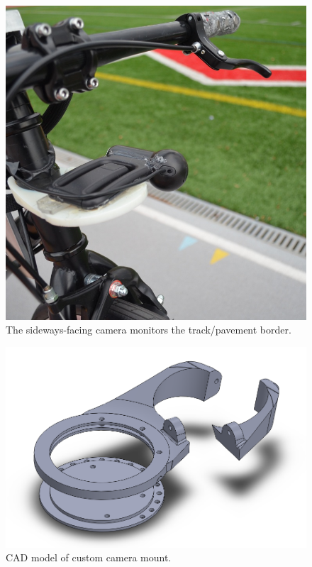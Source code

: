 \documentclass[aps,twocolumn,secnumarabic,balancelastpage,amsmath,amssymb,nofootinbib]{revtex4-1}
\begin{document}
\begin{figure}
\includegraphics[scale=0.18]{camera_angle.jpg}
\caption{The sideways-facing camera monitors the track/pavement border.}
\label{fig:CameraAngle}
\end{figure}

\begin{figure}
\includegraphics[scale=0.25]{camera_mount_exploded.png}
\caption{CAD model of custom camera mount.}
\label{fig:CameraMountCAD}
\end{figure}
\end{document}
